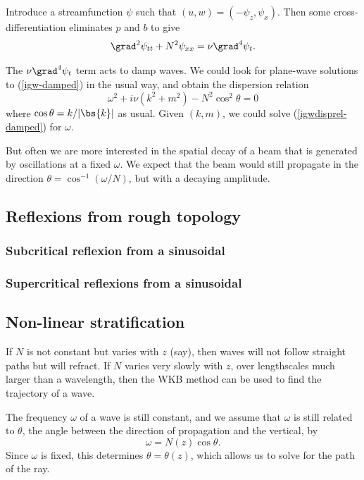 Introduce a streamfunction $\psi$ such that $(u,w) = (-\psi_z, \psi_x)$. Then some cross-differentiation eliminates $p$ and $b$ to give
\begin{equation}
	\grad^2 \psi_{tt} + N^2 \psi_{xx} = \nu\grad^4 \psi_t.
	\label{igw-damped}
\end{equation} 

The $\nu\grad^4\psi_t$ term acts to damp waves. We could look for plane-wave solutions to (\ref{igw-damped}) in the usual way, and obtain the dispersion relation
\begin{equation}
	\omega^2 + i\nu(k^2+m^2) - N^2\cos^2\theta = 0
	\label{igwdisprel-damped}
\end{equation}
where $\cos\theta = k/|\bs{k}|$ as usual. Given $(k,m)$, we could solve (\ref{igwdisprel-damped}) for $\omega$. 

But often we are more interested in the spatial decay of a beam that is generated by oscillations at a fixed $\omega$. We expect that the beam would still propagate in the direction $\theta = \cos^{-1} (\omega/N)$, but with a decaying amplitude.

\subsection{Reflexions from rough topology}

\subsubsection{Subcritical reflexion from a sinusoidal}
\subsubsection{Supercritical reflexions from a sinusoidal}

\subsection{Non-linear stratification}

If $N$ is not constant but varies with $z$ (say), then waves will not follow straight paths but will refract. If $N$ varies very slowly with $z$, over lengthscales much larger than a wavelength, then the WKB method can be used to find the trajectory of a wave. 

The frequency $\omega$ of a wave is still constant, and we assume that $\omega$ is still related to $\theta$, the angle between the direction of propagation and the vertical, by
\begin{equation}
 \omega = N(z)\cos\theta.
\end{equation}
Since $\omega$ is fixed, this determines $\theta = \theta(z)$, which allows us to solve for the path of the ray.

